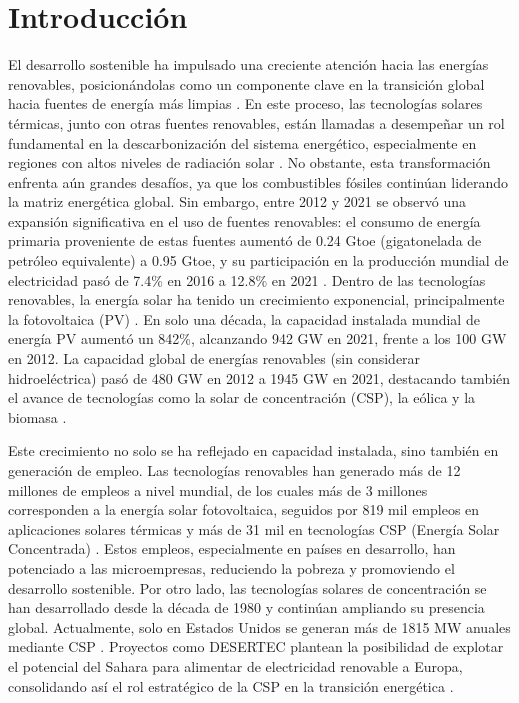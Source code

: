 \documentclass[11pt]{report}
\begin{document}
\tableofcontents


\chapter{Introducción}

El desarrollo sostenible ha impulsado una creciente atención hacia las energías renovables, posicionándolas como un componente clave en la transición global hacia fuentes de energía más limpias \cite{strielkowski2021renewable}. En este proceso, las tecnologías solares térmicas, junto con otras fuentes renovables, están llamadas a desempeñar un rol fundamental en la descarbonización del sistema energético, especialmente en regiones con altos niveles de radiación solar
\cite{iea2020world}. No obstante, esta transformación enfrenta aún grandes desafíos, ya que los combustibles fósiles continúan liderando la matriz energética global.
Sin embargo, entre 2012 y 2021 se observó una expansión significativa en el uso de fuentes renovables: el consumo de energía primaria proveniente de estas fuentes aumentó de 0.24 Gtoe (gigatonelada de petróleo equivalente) a 0.95 Gtoe, y su participación en la producción mundial de electricidad pasó de 7.4\% en 2016 a 12.8\% en 2021 \cite{Yildizbasi}.
Dentro de las tecnologías renovables, la energía solar ha tenido un crecimiento exponencial, principalmente la fotovoltaica (PV) \cite{baker2021power}. En solo una década, la capacidad instalada mundial de energía PV aumentó un 842\%, alcanzando 942 GW en 2021, frente a los 100 GW en 2012. La capacidad global de energías renovables (sin considerar hidroeléctrica) pasó de 480 GW en 2012 a 1945 GW en 2021, destacando también el avance de tecnologías como la solar de concentración (CSP), la eólica y la biomasa \cite{Yildizbasi}.

Este crecimiento no solo se ha reflejado en capacidad instalada, sino también en generación de empleo. Las tecnologías renovables han generado más de 12 millones de empleos a nivel mundial, de los cuales más de 3 millones corresponden a la energía solar fotovoltaica, seguidos por 819 mil empleos en aplicaciones solares térmicas y más de 31 mil en tecnologías CSP (Energía Solar Concentrada) \cite{Anwar}. Estos empleos, especialmente en países en desarrollo, han potenciado a las microempresas, reduciendo la pobreza y promoviendo el desarrollo sostenible.
Por otro lado, las tecnologías solares de concentración se han desarrollado desde la década de 1980 y continúan ampliando su presencia global. Actualmente, solo en Estados Unidos se generan más de 1815 MW anuales mediante CSP \cite{SEIA_CSP}. %
Proyectos como DESERTEC plantean la posibilidad de explotar el potencial del Sahara para alimentar de electricidad renovable a Europa, consolidando así el rol estratégico de la CSP en la transición energética \cite{Anwar}.
\end{document}
